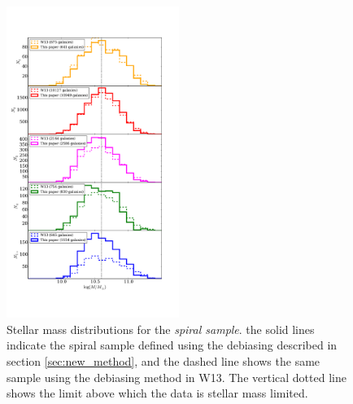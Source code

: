 \documentclass[useAMS,usenatbib]{mn2e}
\begin{document}
\begin{figure}
		\centering
		
        \includegraphics[width=0.5\textwidth]{Histograms/mass_histogram.pdf}
		
        \caption{Stellar mass distributions for the \textit{spiral sample}. the solid lines indicate the spiral sample defined using the debiasing described in section \ref{sec:new_method}, and the dashed line shows the same sample using the debiasing method in W13. The vertical dotted line shows the limit above which the data is stellar mass limited.}
		
        \label{fig:mass_histogram}
        
\end{figure}
\end{document}
